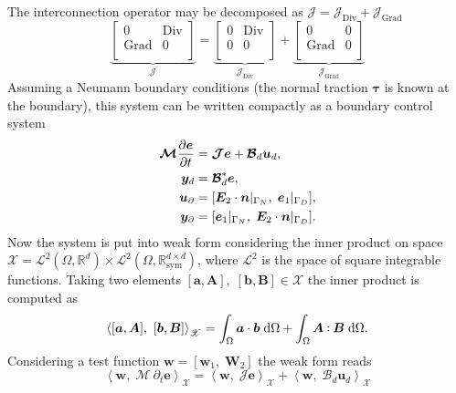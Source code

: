 \documentclass{svjour3}                     %
\DeclareMathOperator*{\Grad}{Grad}
\DeclareMathOperator*{\Div}{Div}
\def\onedot{$\mathsurround0pt\ldotp$}
\def\cddot{%
	\mathbin{\vcenter{\baselineskip.67ex
			\hbox{\onedot}\hbox{\onedot}}%
}}
\begin{document}
The interconnection operator may be decomposed as $\bm{\mathcal{J}} = \bm{\mathcal{J}}_{\Div} + \bm{\mathcal{J}}_{\Grad}$
\begin{equation}
\underbrace{\begin{bmatrix}
	0 & \Div \\ \Grad & 0 \\
	\end{bmatrix}}_{\bm{\mathcal{J}}} = 
\underbrace{\begin{bmatrix}
	0 & \Div \\ 0  & 0 \\
	\end{bmatrix}}_{\bm{\mathcal{J}}_{\Div}} + 
\underbrace{\begin{bmatrix}
	0 & 0 \\ \Grad & 0 \\
	\end{bmatrix}}_{\bm{\mathcal{J}}_{\Grad}}
\end{equation}
Assuming a Neumann boundary conditions (the normal traction $\bm\tau$ is known at the boundary),
this system can be written compactly as a boundary control system
\begin{equation}
\label{eq:eldyn_PDE}
\begin{aligned}
\bm{\mathcal{M}} \diffp{\bm{e}}{t} &= \bm{\mathcal{J}} \bm{e} + \bm{\mathcal{B}}_d \bm{u}_d, \\
\bm{y}_d &= \bm{\mathcal{B}}_d^* \bm{e}, \\
\bm{u}_\partial &= [\bm{E}_2 \cdot \bm{n}|_{\Gamma_N}, \; \bm{e}_1|_{\Gamma_D}], \\
\bm{y}_\partial &= [\bm{e}_1|_{\Gamma_N}, \; \bm{E}_2 \cdot \bm{n}|_{\Gamma_D}].
\end{aligned}
\end{equation}
Now the system is put into weak form considering the inner product on space $\mathscr{X} = \mathscr{L}^2(\Omega, \mathbb{R}^d) \times \mathscr{L}^2(\Omega, \mathbb{R}^{d\times d}_{\text{sym}})$, where $\mathscr{L}^2$ is the space of square integrable functions. Taking two elements $[\bm{a}, \bm{A}], \; [\bm{b}, \bm{B}] \in \mathscr{X}$ the inner product is computed as
\[
\left\langle [\bm{a}, \bm{A}], \ [\bm{b}, \bm{B}] \right\rangle_{\mathscr{X}} = \int_{\Omega} \bm{a} \cdot \bm{b} \d{\Omega} + \int_{\Omega} \bm{A} \cddot \bm{B} \d{\Omega}.
\]
Considering a test function $\bm{w} = [\bm{w}_1, \; \bm{W}_2]$ the weak form reads
\begin{equation*}
\left\langle \bm{w}, \; \bm{\mathcal{M}} \ \partial_t \bm{e} \right\rangle_{\mathscr{X}} = \left\langle \bm{w}, \; \bm{\mathcal{J}} \bm{e} \right\rangle_{\mathscr{X}} + \left\langle \bm{w}, \; \bm{\mathcal{B}}_d \bm{u}_d \right\rangle_{\mathscr{X}}
\end{equation*}
\end{document}
